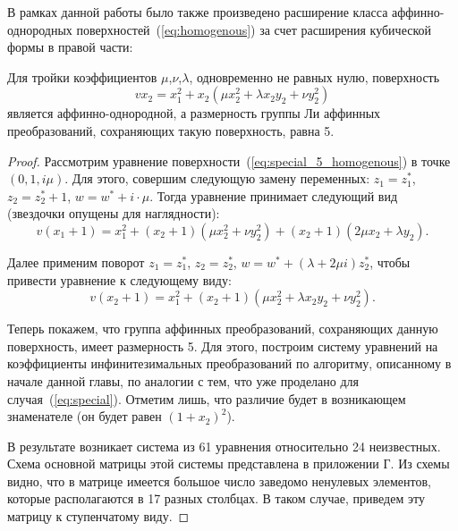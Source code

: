 \documentclass[../main.tex]{subfiles}
\begin{document}
В рамках данной работы было также произведено расширение класса аффинно-однородных поверхностей~(\ref{eq:homogenous}) за счет расширения кубической формы в правой части:
\begin{theorem}\label{special_homogenous}
Для тройки коэффициентов $\mu$,$\nu$,$\lambda$, одновременно не равных нулю, поверхность
\begin{equation}\label{eq:special_5_homogenous}
v x_2 = x_1^2 + x_2 (\mu x_2 ^2 + \lambda x_2 y_2 + \nu y_2 ^2)
\end{equation}
является аффинно-однородной, а размерность группы Ли аффинных преобразований, сохраняющих такую поверхность, равна 5.
\end{theorem}
\begin{proof}

Рассмотрим уравнение поверхности~(\ref{eq:special_5_homogenous}) в точке $(0, 1, i\mu)$. Для этого, совершим следующую замену переменных: $z_1 = z^*_1$, $z_2 = z^*_2 + 1$, $w = w^* + i\cdot \mu$. Тогда уравнение принимает следующий вид (звездочки опущены для наглядности):
\begin{equation*}
v \left(x_1+1\right)=x_1^2 + \left(x_2+1\right) \left(\mu  x_2^2+\nu  y_2^2\right) + \left(x_2+1\right) \left(2 \mu  x_2+\lambda  y_2\right).
\end{equation*}

Далее применим поворот $z_1 = z^*_1$, $z_2 = z^*_2 $, $w = w^* + (\lambda + 2 \mu i) z^*_2$, чтобы привести уравнение к следующему виду:
\begin{equation*}
v (x_2 + 1) = x_1^2 + (x_2 + 1) (\mu x_2 ^2 + \lambda x_2 y_2 + \nu y_2 ^2).
\end{equation*}

Теперь покажем, что группа аффинных преобразований, сохраняющих данную поверхность, имеет размерность 5. Для этого, построим систему уравнений на коэффициенты инфинитезимальных преобразований по алгоритму, описанному в начале данной главы, по аналогии с тем, что уже проделано для случая~(\ref{eq:special}). Отметим лишь, что различие будет в возникающем знаменателе (он будет равен $(1 + x_2)^2$).

В результате возникает система из 61 уравнения относительно 24 неизвестных. Схема основной матрицы этой системы представлена в приложении Г. Из схемы видно, что в матрице имеется большое число заведомо ненулевых элементов, которые располагаются в 17 разных столбцах. В таком случае, приведем эту матрицу к ступенчатому виду.


\end{proof}
\end{document}
